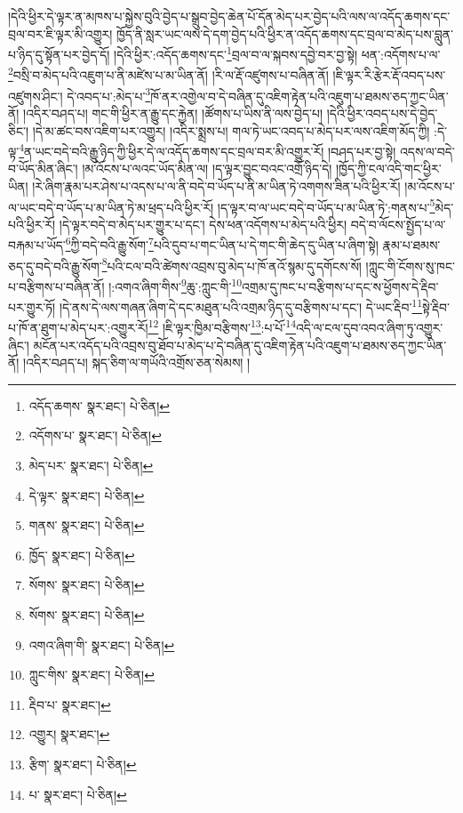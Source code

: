 །དེའི་ཕྱིར་དེ་ལྟར་ན་མཁས་པ་སྐྱེས་བུའི་བྱེད་པ་སྒྲུབ་བྱེད་ཆེན་པོ་དོན་མེད་པར་བྱེད་པའི་ལས་ལ་འདོད་ཆགས་དང་བྲལ་བར་ཇི་ལྟར་མི་འགྱུར། ཁྱོད་ནི་སླར་ཡང་ལས་དེ་དག་བྱེད་པའི་ཕྱིར་ན་འདོད་ཆགས་དང་བྲལ་བ་མེད་པས་བླུན་པ་ཉིད་དུ་སྟོན་པར་བྱེད་དོ། །དེའི་ཕྱིར་:འདོད་ཆགས་དང་\footnote{འདོད་ཆགས་  སྣར་ཐང་།  པེ་ཅིན། }བྲལ་བ་ལ་སྐབས་དབྱེ་བར་བྱ་སྟེ། ཕན་:འདོགས་པ་ལ་\footnote{འདོགས་པ་  སྣར་ཐང་།  པེ་ཅིན། }བསྲི་བ་མེད་པའི་འཇུག་པ་ནི་མཛེས་པ་མ་ཡིན་ནོ། །རི་ལ་རྡོ་འཛུགས་པ་བཞིན་ནོ། །ཇི་ལྟར་རི་རྩེར་རྡོ་འབད་པས་འཛུགས་ཤིང་། དེ་འབད་པ་:མེད་པ་\footnote{མེད་པར་  སྣར་ཐང་།  པེ་ཅིན། }ཁོ་ནར་འགྱེལ་བ་དེ་བཞིན་དུ་འཇིག་རྟེན་པའི་འཇུག་པ་ཐམས་ཅད་ཀྱང་ཡིན་ནོ། །འདིར་བཤད་པ། གང་གི་ཕྱིར་ན་རྒྱུ་དང་རྐྱེན། །ཚོགས་པ་ཡིས་ནི་ལས་བྱེད་པ། །དེའི་ཕྱིར་འབད་པས་དེ་བྱེད་ཅིང་། །དེ་མ་ཚང་བས་འཇིག་པར་འགྱུར། །འདིར་སྨྲས་པ། གལ་ཏེ་ཡང་འབད་པ་མེད་པར་ལས་འཇིག་མོད་ཀྱི། :དེ་ལྟ་\footnote{དེ་ལྟར་  སྣར་ཐང་།  པེ་ཅིན། }ན་ཡང་བདེ་བའི་རྒྱུ་ཉིད་ཀྱི་ཕྱིར་དེ་ལ་འདོད་ཆགས་དང་བྲལ་བར་མི་འགྱུར་རོ། །བཤད་པར་བྱ་སྟེ། འདས་ལ་བདེ་བ་ཡོད་མིན་ཞིང་། །མ་འོངས་པ་ལའང་ཡོད་མིན་ལ། །ད་ལྟར་བྱུང་བའང་འགྲོ་ཉིད་དེ། །ཁྱོད་ཀྱི་ངལ་འདི་གང་ཕྱིར་ཡིན། །རེ་ཞིག་རྣམ་པར་ཤེས་པ་འདས་པ་ལ་ནི་བདེ་བ་ཡོད་པ་ནི་མ་ཡིན་ཏེ་འགགས་ཟིན་པའི་ཕྱིར་རོ། །མ་འོངས་པ་ལ་ཡང་བདེ་བ་ཡོད་པ་མ་ཡིན་ཏེ་མ་ཕྲད་པའི་ཕྱིར་རོ། །ད་ལྟར་བ་ལ་ཡང་བདེ་བ་ཡོད་པ་མ་ཡིན་ཏེ་:གནས་པ་\footnote{གནས་  སྣར་ཐང་།  པེ་ཅིན། }མེད་པའི་ཕྱིར་རོ། །དེ་ལྟར་བདེ་བ་མེད་པར་གྱུར་པ་དང་། དེས་ཕན་འདོགས་པ་མེད་པའི་ཕྱིར། བདེ་བ་ལོངས་སྤྱོད་པ་ལ་བརྐམ་པ་ཡོད་\footnote{ཁྱོད་  སྣར་ཐང་།  པེ་ཅིན། }ཀྱི་བདེ་བའི་རྒྱུ་སོག་\footnote{སོགས་  སྣར་ཐང་།  པེ་ཅིན། }པའི་དུབ་པ་གང་ཡིན་པ་དེ་གང་གི་ཆེད་དུ་ཡིན་པ་ཞིག་སྟེ། རྣམ་པ་ཐམས་ཅད་དུ་བདེ་བའི་རྒྱུ་སོག་\footnote{སོགས་  སྣར་ཐང་།  པེ་ཅིན། }པའི་ངལ་བའི་ཚེགས་འབྲས་བུ་མེད་པ་ཁོ་ནའོ་སྙམ་དུ་དགོངས་སོ། །ཀླུང་གི་ངོགས་སུ་ཁང་པ་བརྩིགས་པ་བཞིན་ནོ། །:འགའ་ཞིག་གིས་\footnote{འགའ་ཞིག་གི་  སྣར་ཐང་།  པེ་ཅིན། }ཆུ་:ཀླུང་གི་\footnote{ཀླུང་གིས་  སྣར་ཐང་།  པེ་ཅིན། }འགྲམ་དུ་ཁང་པ་བརྩིགས་པ་དང་ས་ཕྱོགས་དེ་རྡིབ་པར་གྱུར་ཏོ། །དེ་ནས་དེ་ལས་གཞན་ཞིག་དེ་དང་མཐུན་པའི་འགྲམ་ཉིད་དུ་བརྩིགས་པ་དང་། དེ་ཡང་རྡིབ་\footnote{རྡིབ་པ་  སྣར་ཐང་། }སྟེ་རྡིབ་པ་ཁོ་ན་ཐུག་པ་མེད་པར་:འགྱུར་རོ།\footnote{འགྱུར།  སྣར་ཐང་། } །ཇི་ལྟར་ཁྱིམ་བརྩིགས་\footnote{རྩིག་  སྣར་ཐང་།  པེ་ཅིན། }:པ་པོ་\footnote{པ་  སྣར་ཐང་།  པེ་ཅིན། }འདི་ལ་ངལ་དུབ་འབའ་ཞིག་ཏུ་འགྱུར་ཞིང་། མངོན་པར་འདོད་པའི་འབྲས་བུ་ཐོབ་པ་མེད་པ་དེ་བཞིན་དུ་འཇིག་རྟེན་པའི་འཇུག་པ་ཐམས་ཅད་ཀྱང་ཡིན་ནོ། །འདིར་བཤད་པ། སྐད་ཅིག་ལ་གཡོའི་འགྲོས་ཅན་སེམས། །

